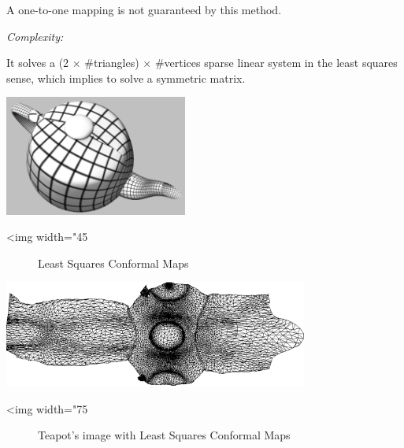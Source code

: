 A one-to-one mapping
is not guaranteed by this method.

\emph{Complexity:}

It solves a (2 $\times$
\#triangles) $\times$ \#vertices sparse linear system in the least squares sense,
which implies to solve a symmetric matrix.

\begin{center}
    \label{Surface_mesh_parameterization-fig-LSCM}
    \begin{ccTexOnly}
        \includegraphics[width=0.45\textwidth]{Surface_mesh_parameterization/LSCM}
    \end{ccTexOnly}
    \begin{ccHtmlOnly}
        <img width="45%
    \end{ccHtmlOnly}
    \begin{figure}[h]
        \caption{Least Squares Conformal Maps}
    \end{figure}
\end{center}

\begin{center}
    \label{Surface_mesh_parameterization-fig-LSCM_2}
    \begin{ccTexOnly}
        \includegraphics[width=0.75\textwidth]{Surface_mesh_parameterization/LSCM_2}
    \end{ccTexOnly}
    \begin{ccHtmlOnly}
        <img width="75%
    \end{ccHtmlOnly}
    \begin{figure}[h]
        \caption{Teapot's image with Least Squares Conformal Maps}
    \end{figure}
\end{center}


